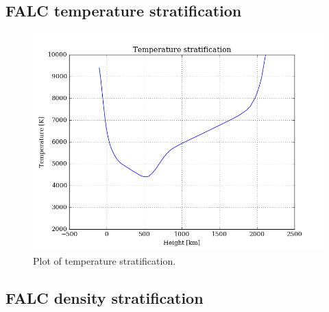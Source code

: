 \documentclass[11pt,a4paper,notitlepage]{article}
\begin{document}
\subsection{FALC temperature stratification}
\begin{figure}[H]
\center
\includegraphics[scale=0.42]{../figs/temp_vs_h.png}
\caption{Plot of temperature stratification.}
\end{figure}


\subsection{FALC density stratification}
\end{document}
